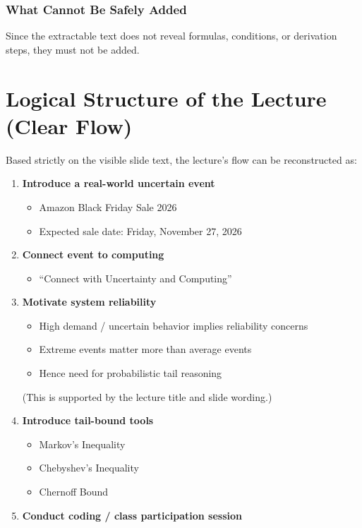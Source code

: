 \documentclass[11pt]{article}
\begin{document}
\subsubsection*{What Cannot Be Safely Added}
Since the extractable text does not reveal formulas, conditions, or derivation steps, they must not be added.

\section{Logical Structure of the Lecture (Clear Flow)}

Based strictly on the visible slide text, the lecture's flow can be reconstructed as:

\begin{enumerate}
    \item \textbf{Introduce a real-world uncertain event}
    \begin{itemize}
        \item Amazon Black Friday Sale 2026
        \item Expected sale date: Friday, November 27, 2026
    \end{itemize}

    \item \textbf{Connect event to computing}
    \begin{itemize}
        \item ``Connect with Uncertainty and Computing''
    \end{itemize}

    \item \textbf{Motivate system reliability}
    \begin{itemize}
        \item High demand / uncertain behavior implies reliability concerns
        \item Extreme events matter more than average events
        \item Hence need for probabilistic tail reasoning
    \end{itemize}
    (This is supported by the lecture title and slide wording.)

    \item \textbf{Introduce tail-bound tools}
    \begin{itemize}
        \item Markov's Inequality
        \item Chebyshev's Inequality
        \item Chernoff Bound
    \end{itemize}

    \item \textbf{Conduct coding / class participation session}
\end{enumerate}
\end{document}
